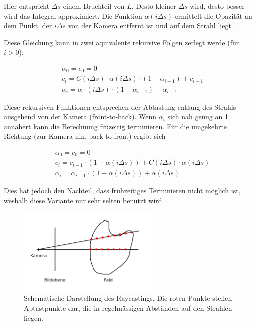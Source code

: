\documentclass[a4paper,fontsize=12pt,toc=bib,halfparskip]{scrartcl}
\begin{document}
Hier entspricht $\Delta s$ einem Bruchteil von $L$. Desto kleiner $\Delta s$ wird, desto besser wird das Integral approximiert. Die Funktion $\alpha(i \Delta s)$ ermittelt die Opazit\"at an dem Punkt, der $i \Delta s$ von der Kamera entfernt ist und auf dem Strahl liegt.

Diese Gleichung kann in zwei \"aquivalente rekursive Folgen zerlegt werde (f\"ur $i > 0$):

\begin{align}
&\alpha_0 = c_0 = 0\\
&c_i = C(i\Delta s)\cdot\alpha(i\Delta s)\cdot(1-\alpha_{i-1}) + c_{i-1}\\
&\alpha_i = \alpha\cdot(i \Delta s)\cdot(1-\alpha_{i-1}) + \alpha_{i-1} 
\label{RaycastingFormula}
\end{align} 

Diese rekursiven Funktionen entsprechen der Abtastung entlang des Strahls ausgehend von der Kamera (front-to-back). Wenn $\alpha_i$ sich nah genug an 1 ann\"ahert kann die Berechnung fr\"uzeitig terminieren. F\"ur die umgekehrte Richtung (zur Kamera hin, back-to-front) ergibt sich

\begin{align}
&\alpha_0 = c_0 = 0\\
&c_i = c_{i-1}\cdot(1 - \alpha(i\Delta s)) + C(i\Delta s)\cdot\alpha(i\Delta s)\\
&\alpha_i = \alpha_{i-1}\cdot(1 - \alpha(i\Delta s)) + \alpha(i \Delta s) 
\end{align}

Dies hat jedoch den Nachteil, dass fr\"uhzeitiges Terminieren nicht m\"oglich ist, weshalb diese Variante nur sehr selten benutzt wird.


\begin{figure}
	\centering
	\includegraphics[width=0.6\textwidth]{pictures/Raycasting}
	\caption{Schematische Darstellung des Raycastings. Die roten Punkte stellen Abtastpunkte dar, die in regelm\"assigen Abst\"anden auf den Strahlen liegen.}
	\label{Raycasting}
\end{figure}
\end{document}
